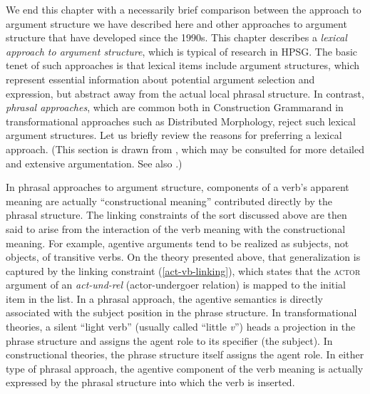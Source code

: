 \documentclass[output=paper
 	        ,biblatex
                ,babelshorthands
                ,newtxmath
                ,draftmode
                ,colorlinks, citecolor=brown
]{langscibook}
\begin{document}
We end this chapter with a necessarily brief comparison between the approach to argument structure we have described here and other approaches to argument structure that have developed since the 1990s.
This chapter describes a \textit{lexical approach to argument structure}, which is typical of research in HPSG.  The basic tenet of such approaches is that lexical items include argument structures, which represent essential information about potential argument selection and expression, but
abstract away from the actual local phrasal structure.  In contrast, \emph{phrasal approaches}, which
are common both in Construction Grammar\indexcxg and in transformational approaches such as Distributed Morphology, reject such lexical argument structures.   Let us briefly review the reasons for preferring a lexical approach. (This section is drawn from \citealt{MWArgSt}, which may be consulted for more detailed and extensive argumentation. See also .) 

In phrasal approaches to argument structure, components of a verb's apparent meaning are actually ``constructional meaning'' contributed directly by the phrasal structure.  The linking constraints of the sort discussed above are then said to arise from the interaction of the verb meaning with the constructional meaning.  For example, agentive arguments tend to be realized as subjects, not objects, of transitive verbs.  On the theory presented above, that generalization is captured by the linking constraint (\ref{act-vb-linking}), which states that the \textsc{actor} argument of an \textit{act-und-rel} (actor-undergoer relation) is mapped to the initial item in the \argst list.  In a phrasal approach, the agentive semantics is directly associated with the subject position in the phrase structure.  In transformational theories, a silent ``light verb'' (usually called ``little \textit{v}'') heads a projection in the phrase structure and assigns the agent role to its specifier (the subject).  In constructional theories, the phrase structure itself assigns the agent role.  In either type of phrasal approach, the agentive component of the verb meaning is actually expressed by the phrasal structure into which the verb is inserted.  
\end{document}
